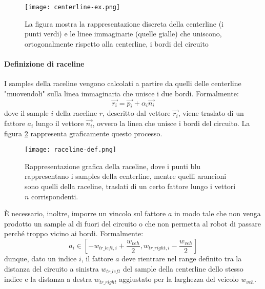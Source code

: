 \begin{figure}[h]
	\begin{center}
		\texttt{[image: centerline-ex.png]}
	\end{center}
	\caption{La figura mostra la rappresentazione discreta della centerline (i punti verdi) e le linee
		immaginarie (quelle gialle) che uniscono, ortogonalmente rispetto alla centerline, i bordi
		del circuito}
		\label{fig:centerline-ex}
\end{figure}

\paragraph{Definizione di raceline}
\label{par:raceline}
I samples della raceline vengono calcolati a partire da quelli delle centerline "muovendoli" sulla linea
immaginaria che unisce i due bordi. Formalmente:
\[
	\overrightarrow{r_i} = \overrightarrow{p_i} + \alpha_i \overrightarrow{n_i}
\]
dove il sample $i$ della raceline $r$, descritto dal vettore $\overrightarrow{r_i}$, viene traslato di un
fattore $a_i$ lungo il vettore $\overrightarrow{n_i}$, ovvero la linea che unisce i bordi del circuito.
La figura \ref{fig:raceline-def} rappresenta graficamente questo processo.

\begin{figure}[h]
	\begin{center}
		\texttt{[image: raceline-def.png]}
	\end{center}
	\caption{Rappresentazione grafica della raceline, dove i punti blu rappresentano i samples della
		centerline, mentre quelli arancioni sono quelli della raceline, traslati di un certo fattore lungo i
		vettori $n$ corrispondenti. \cite{lection22}}
	\label{fig:raceline-def}
\end{figure}

È necessario, inoltre, imporre un vincolo sul fattore $a$ in modo tale che non venga prodotto un sample
al di fuori del circuito o che non permetta al robot di passare perché troppo vicino ai bordi.
Formalmente:
\begin{equation}
	a_i \in [ -w_{tr\_left, i} + \frac{w_{veh}}{2}, w_{tr\_right, i} - \frac{w_{veh}}{2}]
	\label{eq:a_constr}
\end{equation}
dunque, dato un indice $i$, il fattore $a$ deve rientrare nel range definito tra la distanza del circuito
a sinistra $w_{tr\_left}$ del sample della centerline dello stesso indice e la distanza a destra
$w_{tr\_right}$ aggiustato per la larghezza del veicolo $w_{veh}$.

